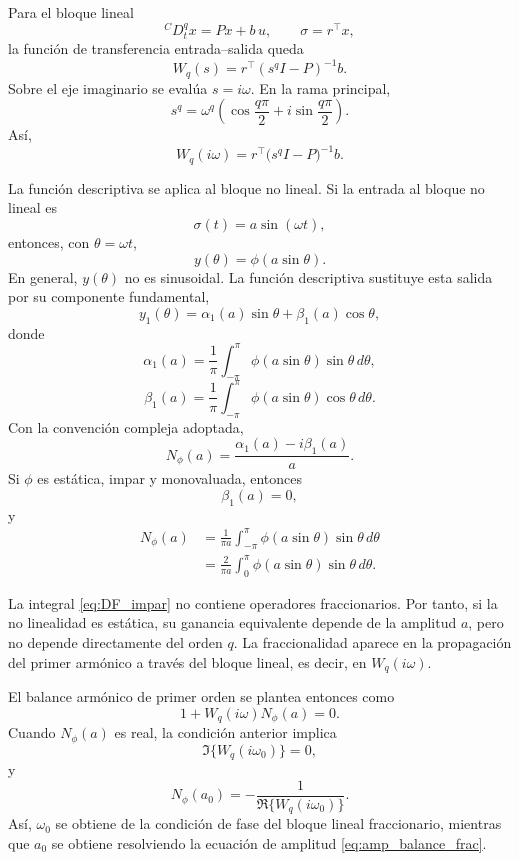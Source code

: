 \documentclass[journal]{IEEEtran}
\begin{document}
Para el bloque lineal
\[
{}^{C}D_t^q x = P x + b\,u,
\qquad
\sigma=r^\top x,
\]
la función de transferencia entrada--salida queda
\begin{equation}
\label{eq:Wq_frac_teorico}
W_q(s)
=
r^\top(s^q I-P)^{-1}b.
\end{equation}
Sobre el eje imaginario se evalúa \(s=i\omega\). En la rama principal,
\begin{equation}
\label{eq:sq_freq_frac}
s^q
=
\omega^q
\left(
\cos\frac{q\pi}{2}
+
i\sin\frac{q\pi}{2}
\right).
\end{equation}
Así,
\begin{equation}
\label{eq:Wq_frac_imag_teorico}
W_q(i\omega)
=
r^\top\bigl(s^q I-P\bigr)^{-1}b.
\end{equation}

La función descriptiva se aplica al bloque no lineal. Si la entrada al
bloque no lineal es
\[
\sigma(t)=a\sin(\omega t),
\]
entonces, con \(\theta=\omega t\),
\[
y(\theta)=\phi(a\sin\theta).
\]
En general, \(y(\theta)\) no es sinusoidal. La función descriptiva sustituye
esta salida por su componente fundamental,
\[
y_1(\theta)
=
\alpha_1(a)\sin\theta+\beta_1(a)\cos\theta,
\]
donde
\[
\alpha_1(a)
=
\frac{1}{\pi}
\int_{-\pi}^{\pi}
\phi(a\sin\theta)\sin\theta\,d\theta,
\]
\[
\beta_1(a)
=
\frac{1}{\pi}
\int_{-\pi}^{\pi}
\phi(a\sin\theta)\cos\theta\,d\theta.
\]
Con la convención compleja adoptada,
\begin{equation}
\label{eq:DF_general}
N_\phi(a)
=
\frac{\alpha_1(a)-i\beta_1(a)}{a}.
\end{equation}
Si \(\phi\) es estática, impar y monovaluada, entonces
\[
\beta_1(a)=0,
\]
y
\begin{equation}
\label{eq:DF_impar}
\begin{aligned}
N_\phi(a)
&=
\frac{1}{\pi a}
\int_{-\pi}^{\pi}
\phi(a\sin\theta)\sin\theta\,d\theta\\
&=
\frac{2}{\pi a}
\int_{0}^{\pi}
\phi(a\sin\theta)\sin\theta\,d\theta.
\end{aligned}
\end{equation}

La integral \eqref{eq:DF_impar} no contiene operadores fraccionarios. Por
tanto, si la no linealidad es estática, su ganancia equivalente depende de
la amplitud \(a\), pero no depende directamente del orden \(q\). La
fraccionalidad aparece en la propagación del primer armónico a través del
bloque lineal, es decir, en \(W_q(i\omega)\).

El balance armónico de primer orden se plantea entonces como
\begin{equation}
\label{eq:balance_frac_Wq}
1+W_q(i\omega)N_\phi(a)=0.
\end{equation}
Cuando \(N_\phi(a)\) es real, la condición anterior implica
\[
\Im\{W_q(i\omega_0)\}=0,
\]
y
\begin{equation}
\label{eq:amp_balance_frac}
N_\phi(a_0)
=
-\frac{1}{\Re\{W_q(i\omega_0)\}}.
\end{equation}
Así, \(\omega_0\) se obtiene de la condición de fase del bloque lineal
fraccionario, mientras que \(a_0\) se obtiene resolviendo la ecuación de
amplitud \eqref{eq:amp_balance_frac}.
\end{document}
